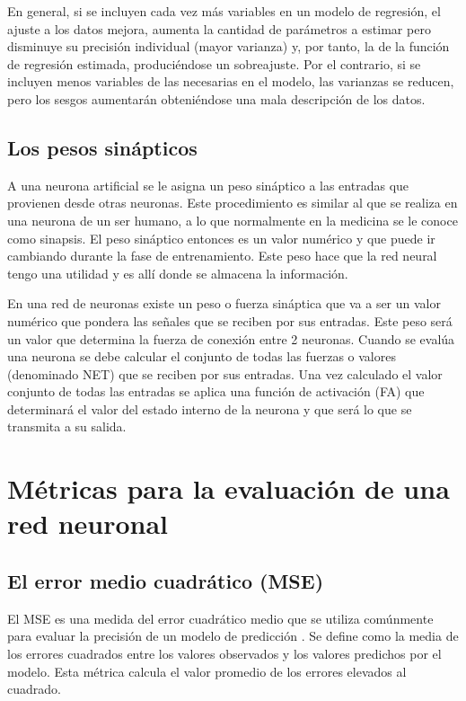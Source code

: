 \vspace{1\baselineskip}
En general, si se incluyen cada vez más variables en un modelo de regresión, el
ajuste a los datos mejora, aumenta la cantidad de parámetros a estimar pero
disminuye su precisión individual (mayor varianza) y, por tanto, la de la
función de regresión estimada, produciéndose un sobreajuste. Por el contrario,
si se incluyen menos variables de las necesarias en el modelo, las varianzas se
reducen, pero los sesgos aumentarán obteniéndose una mala descripción de los
datos\cite{carrasco2016tecnicas}.

\subsection{Los pesos sinápticos}
A una neurona artificial se le asigna un peso sináptico a las entradas que
provienen desde otras neuronas. Este procedimiento es similar al que se realiza
en una neurona de un ser humano, a lo que normalmente en la medicina se le
conoce como sinapsis. El peso sináptico entonces es un valor numérico y que
puede ir cambiando durante la fase de
entrenamiento\cite{acevedo2017principios}. Este peso hace que la red neural
tengo una utilidad y es allí donde se almacena la información.

En una red de neuronas existe un peso o fuerza sináptica que va a ser un valor
numérico que pondera las señales que se reciben por sus entradas. Este peso
será un valor que determina la fuerza de conexión entre 2 neuronas. Cuando se
evalúa una neurona se debe calcular el conjunto de todas las fuerzas o valores
(denominado NET) que se reciben por sus entradas. Una vez calculado el valor
conjunto de todas las entradas se aplica una función de activación (FA) que
determinará el valor del estado interno de la neurona y que será lo que se
transmita a su salida\cite{pose2009introduccion}.

\section{Métricas para la evaluación de una red neuronal}

\subsection{El error medio cuadrático (MSE) }

El MSE es una medida del error cuadrático medio que se utiliza comúnmente para
evaluar la precisión de un modelo de predicción \cite{sepulveda2023analisis}.
Se define como la media de los errores cuadrados entre los valores observados y
los valores predichos por el modelo. Esta métrica calcula el valor promedio de
los errores elevados al cuadrado\cite{chang2023comparacion}.

